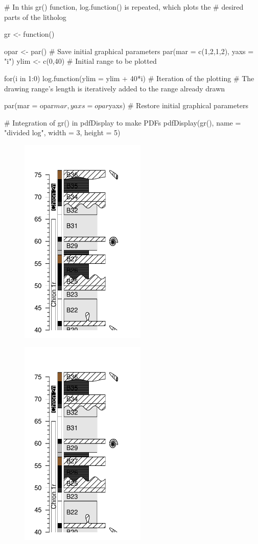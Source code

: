 \begin{example}
# In this gr() function, log.function() is repeated, which plots the
# desired parts of the litholog

gr <- function()
{
   opar <- par()  # Save initial graphical parameters
   par(mar = c(1,2,1,2), yaxs = "i")
   ylim <- c(0,40) # Initial range to be plotted
   
   for(i in 1:0) log.function(ylim = ylim + 40*i) # Iteration of the plotting
   # The drawing range's length is iteratively added to the range already drawn

   par(mar = opar$mar, yaxs = opar$yaxs) # Restore initial graphical parameters
}

# Integration of gr() in pdfDisplay to make PDFs
pdfDisplay(gr(), name = "divided log", width = 3, height = 5)	
\end{example}

\begin{figure}[H]
	\centering
	\includegraphics[width=60mm, page=1]{divided log}
\end{figure}

\begin{figure}[H]
	\centering
	\includegraphics[width=60mm, page=2]{divided log}
\end{figure}

